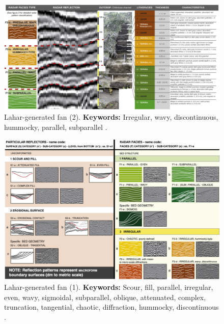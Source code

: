 \begin{landscape}
\begin{figure}[h!]
    \centering
    \includegraphics[width=0.9\linewidth]{Figures/0.2GPR/Ettinger2014_lahar_7.png}
    \caption[Lahar-generated fan (1).]{Lahar-generated fan (2). \textbf{Keywords: }Irregular, wavy, discontinuous, hummocky, parallel, subparallel \citep{Ettinger2014}.}
    \label{fig:Ettinger2014-7}
\end{figure}
\end{landscape}

\begin{landscape}
    \begin{figure}[h!]
    \centering
    \includegraphics[width=0.9\linewidth]{Figures/0.2GPR/Ettinger2014_lahar_1.png}
    \caption[Lahar-generated fan (2).]{Lahar-generated fan (1). \textbf{Keywords: }Scour, fill, parallel, irregular, even, wavy, sigmoidal, subparallel, oblique, attenuated, complex, truncation, tangential, chaotic, diffraction, hummocky, discontinuous \citep{Ettinger2014}. }
    \label{fig:Ettinger2014-1}
\end{figure}
\end{landscape}
\clearpage

